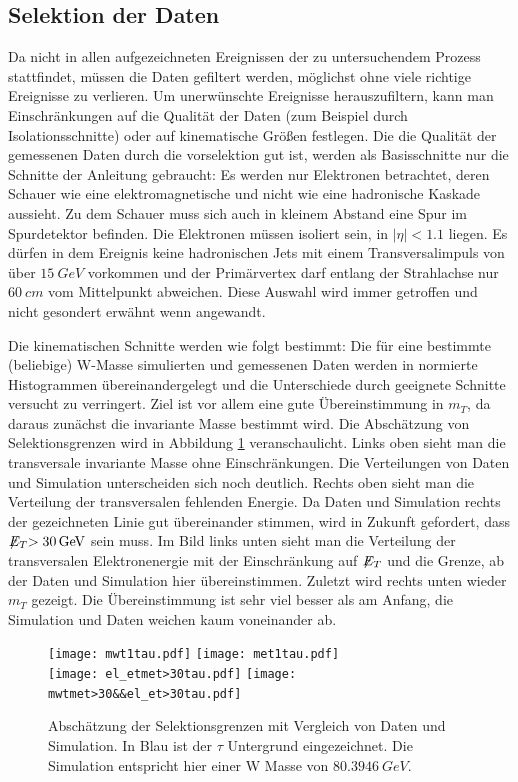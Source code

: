 \documentclass[a4paper,12pt]{article}
\newcommand{\met}{\ensuremath{\not\mathrel{E}}_T}
\begin{document}
\subsection{Selektion der Daten}
Da nicht in allen aufgezeichneten Ereignissen der zu untersuchendem Prozess stattfindet, müssen die
Daten gefiltert werden, möglichst ohne viele richtige Ereignisse zu verlieren.
Um unerwünschte Ereignisse herauszufiltern, kann man Einschränkungen auf die Qualität der Daten (zum Beispiel
durch Isolationsschnitte) oder auf kinematische Größen festlegen.
Die die Qualität der gemessenen Daten durch die vorselektion gut ist, werden als Basisschnitte nur
die Schnitte der Anleitung gebraucht: Es werden nur
Elektronen betrachtet, deren Schauer wie eine elektromagnetische und nicht wie eine hadronische
Kaskade aussieht. Zu dem Schauer muss sich auch in kleinem Abstand eine Spur im Spurdetektor befinden.
Die Elektronen müssen isoliert sein, in $|\eta| < 1.1$ liegen. Es dürfen in dem Ereignis keine
hadronischen Jets mit einem Transversalimpuls von über $\SI{15}{GeV}$ vorkommen und der Primärvertex
darf entlang der Strahlachse nur $\SI{60}{cm}$ vom Mittelpunkt abweichen. Diese Auswahl wird immer
getroffen und nicht gesondert erwähnt wenn angewandt.

Die kinematischen Schnitte werden wie folgt bestimmt:
Die für eine bestimmte (beliebige) W-Masse simulierten und gemessenen Daten werden in normierte Histogrammen übereinandergelegt
und die Unterschiede durch geeignete Schnitte versucht zu verringert. Ziel ist vor allem eine gute
Übereinstimmung in $m_T$, da daraus zunächst die invariante Masse bestimmt wird. Die Abschätzung von Selektionsgrenzen
wird in Abbildung \ref{fig:abschaetzung} veranschaulicht. Links oben sieht man die transversale
invariante Masse ohne Einschränkungen. Die Verteilungen von Daten und Simulation unterscheiden sich
noch deutlich. Rechts oben sieht man die Verteilung der transversalen
fehlenden Energie. Da Daten und Simulation rechts der gezeichneten Linie gut übereinander stimmen,
wird in Zukunft gefordert, dass $\met > \SI{30}{GeV}$ sein muss. Im Bild links unten sieht man die
Verteilung der transversalen Elektronenergie mit der Einschränkung auf $\met$ und die Grenze, ab der Daten und Simulation hier
übereinstimmen. Zuletzt wird rechts unten wieder $m_T$ gezeigt. Die Übereinstimmung ist sehr viel
besser als am Anfang, die Simulation und Daten weichen kaum voneinander ab.

\begin{figure}[h]
	\centering
	\texttt{[image: mwt1tau.pdf]}
	\texttt{[image: met1tau.pdf]}\\
	\texttt{[image: el\_etmet>30tau.pdf]}
	\texttt{[image: mwtmet>30\&\&el\_et>30tau.pdf]}
	\caption{Abschätzung der Selektionsgrenzen mit Vergleich von Daten und Simulation. In Blau ist
	der $τ$ Untergrund eingezeichnet. Die Simulation entspricht hier einer W Masse von
	$\SI{80.3946}{GeV}$.}
	\label{fig:abschaetzung}
\end{figure}
\end{document}
